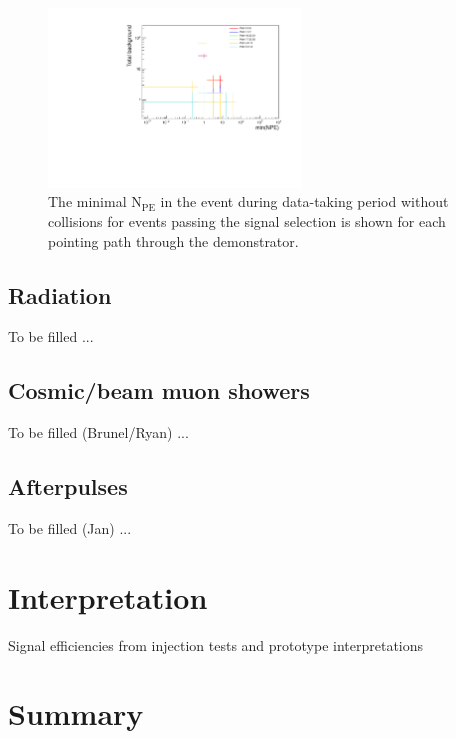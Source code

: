 \documentclass[12pt]{article}
\newcommand{\npe} {\mbox{\ensuremath{\textrm{N}_\textrm{PE}}}\xspace}
\begin{document}

\begin{figure}[ht!]
    \centering
    \includegraphics[width=0.6\textwidth]{figures/perPathPlotsNoBeam.pdf}
    \caption{\label{fig:perPathPlot} The minimal \npe in the event during data-taking period without
    collisions for events passing the signal selection is shown for each pointing path 
    through the demonstrator.}
\end{figure}

\subsection{Radiation}

To be filled ...

\subsection{Cosmic/beam muon showers}

To be filled (Brunel/Ryan) ...

\subsection{Afterpulses}

To be filled (Jan) ...

\section{Interpretation}

Signal efficiencies from injection tests and prototype interpretations
\section{Summary}
\end{document}
